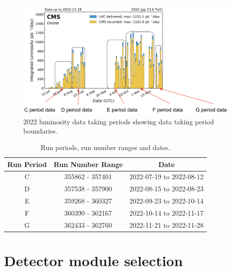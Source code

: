 \begin{figure}[!htp]
  \centering
\includegraphics[width=1\textwidth]{ashish_thesis/2022_lumi_datasets.png}
\caption[2022 CMS Luminosity Data Periods]{%
   2022 luminosity data taking periods showing data taking period boundaries.
}
\label{fig:period_bound_1}
\end{figure}


\begin{table}[h]
  \centering
  \caption[2022 run ranges]{Run periods, run number ranges and dates.}
\begin{tabular}{ccc}
\textbf{Run Period} & \textbf{Run Number Range} & \textbf{Date} \\
\hline
C & 355862 - 357401 & 2022-07-19 to 2022-08-12 \\
D & 357538 - 357900 & 2022-08-15 to 2022-08-23 \\
E & 359268 - 360327 & 2022-09-23 to 2022-10-14 \\
F & 360390 - 362167 & 2022-10-14 to 2022-11-17 \\
G & 362433 - 362760 & 2022-11-21 to 2022-11-28 \\
\end{tabular}
\label{tab:my_label_1}
\end{table}

\section{Detector module selection}


